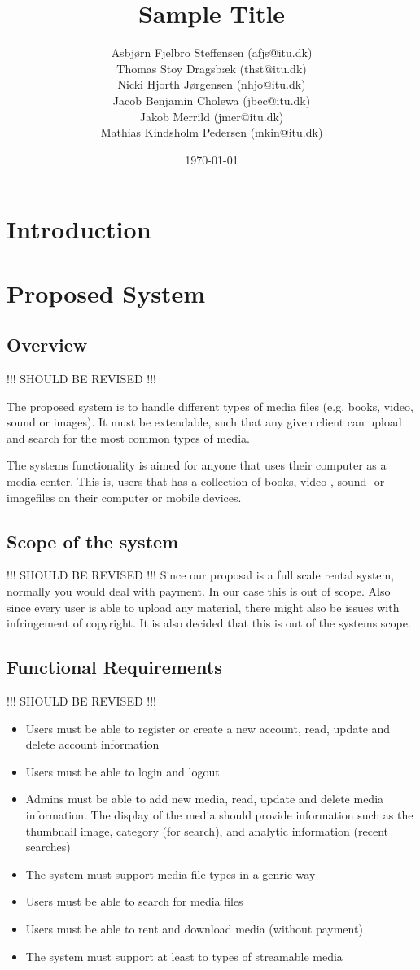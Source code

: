 \documentclass{report}
\title{Sample Title}
\date{\today}
\author{Asbj\o rn Fjelbro Steffensen (afjs@itu.dk)\\ Thomas Stoy Dragsb\ae k (thst@itu.dk)\\ Nicki Hjorth J\o rgensen (nhjo@itu.dk)\\ Jacob Benjamin Cholewa (jbec@itu.dk)\\ Jakob Merrild (jmer@itu.dk)\\ Mathias Kindsholm Pedersen (mkin@itu.dk)}
\begin{document}
\maketitle
\newpage
\tableofcontents

\chapter{Introduction}



\chapter{Proposed System}

\section{Overview}

!!! SHOULD BE REVISED !!!

The proposed system is to handle different types of media files (e.g. books, video, sound or images). It must be extendable, such that any given client can upload and search for the most common types of media.

The systems functionality is aimed for anyone that uses their computer as a media center. This is, users that has a collection of books, video-, sound- or imagefiles on their computer or mobile devices.

\section{Scope of the system}
!!! SHOULD BE REVISED !!!
Since our proposal is a full scale rental system, normally you would deal with payment. In our case this is out of scope. Also since every user is able to upload any material, there might also be  issues with infringement of copyright. It is also decided that this is out of the systems scope.

\section{Functional Requirements}
!!! SHOULD BE REVISED !!!
\begin{itemize}
\item Users must be able to register or create a new account, read, update and delete  account information
\item Users must be able to login and logout
\item Admins must be able to add new media, read, update and delete media information. The display of the media should provide information such as the thumbnail image, category (for search), and analytic information (recent searches)
\item The system must support media file types in a genric way
\item Users must be able to search for media files
\item Users must be able to rent and download media (without payment)
\item The system must support at least to types of streamable media
\end{itemize}
\end{document}
